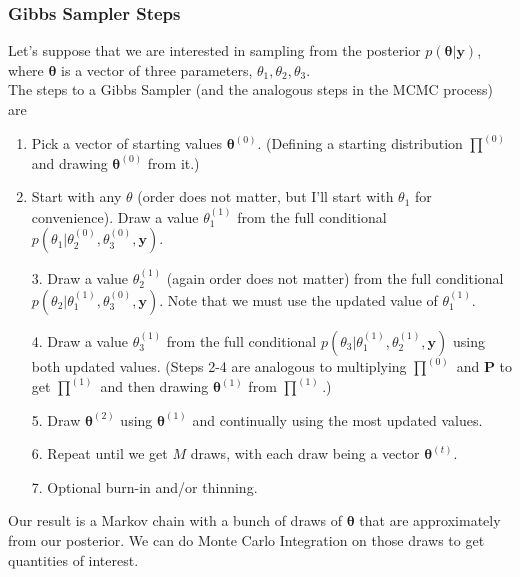 \documentclass{beamer}
\begin{document}
\begin{frame}
\frametitle{Gibbs Sampler Steps}
\pause
Let's suppose that we are interested in sampling from the posterior
$p(\bm{\theta} | \bm{y})$, where $\bm{\theta}$ is a vector of three
parameters, $\theta_1, \theta_2, \theta_3$.\\
\bigskip
\pause
The steps to a Gibbs Sampler \tiny{(and the analogous steps in
the MCMC process)} \normalsize are
\bigskip
\pause
\begin{enumerate}
\item Pick a vector of starting values $\bm{\theta}^{(0)}$.
\tiny{(Defining a starting distribution
$\prod^{(0)}$ and drawing $\bm{\theta}^{(0)}$ from it.)} \normalsize
\pause
\medskip
\item Start with any $\theta$ (order does not matter, but I'll start
with $\theta_1$ for convenience). \pause Draw a value $\theta_1^{(1)}$
from the full conditional $p(\theta_1 | \theta_2^{(0)}, \theta_3^{(0)}, \bm{y})$.
\end{enumerate}
\end{frame}

\begin{frame}
\begin{enumerate}
\item [3.] Draw a value $\theta_2^{(1)}$ (again order does not matter) from
the full conditional  $p(\theta_2 | \theta_1^{(1)}, \theta_3^{(0)},
\bm{y})$. \pause Note that we must use the updated value of $\theta_1^{(1)}$.
\pause
\medskip
\item [4.] Draw a value $\theta_3^{(1)}$ from the full conditional
$p(\theta_3 | \theta_1^{(1)}, \theta_2^{(1)}, \bm{y})$ using both
updated values. \pause \tiny{(Steps 2-4 are analogous to multiplying
$\prod^{(0)}$ and $\bm{P}$ to get $\prod^{(1)}$ and then drawing
$\bm{\theta}^{(1)}$ from $\prod^{(1)}$.)} \normalsize
\pause
\medskip
\item [5.] Draw $\bm{\theta}^{(2)}$ using $\bm{\theta}^{(1)}$ and
continually using the most updated values.
\pause
\medskip
\item [6.] Repeat until we get $M$ draws, with each draw being a vector $\bm{\theta}^{(t)}$.
\pause
\medskip
\item [7.] Optional burn-in and/or thinning.
\end{enumerate}
\pause
\bigskip
Our result is a Markov chain with a bunch of draws of $\bm{\theta}$
that are approximately from our posterior.  \pause We can do Monte
Carlo Integration on
those draws to get quantities of interest.
\end{frame}
\end{document}
